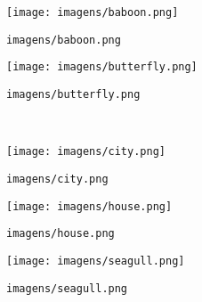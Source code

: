 \begin{subfigure}{0.33\textwidth}
    \centering
    \texttt{[image: imagens/baboon.png]}
    \caption{\texttt{imagens/baboon.png}}
\end{subfigure}%
\begin{subfigure}{0.33\textwidth}
    \centering
    \texttt{[image: imagens/butterfly.png]}
    \caption{\texttt{imagens/butterfly.png}}
\end{subfigure}\\[8pt]
\begin{subfigure}{0.33\textwidth}
    \centering
    \texttt{[image: imagens/city.png]}
    \caption{\texttt{imagens/city.png}}
\end{subfigure}%
\begin{subfigure}{0.33\textwidth}
    \centering
    \texttt{[image: imagens/house.png]}
    \caption{\texttt{imagens/house.png}}
\end{subfigure}%
\begin{subfigure}{0.33\textwidth}
    \centering
    \texttt{[image: imagens/seagull.png]}
    \caption{\texttt{imagens/seagull.png}}
\end{subfigure}